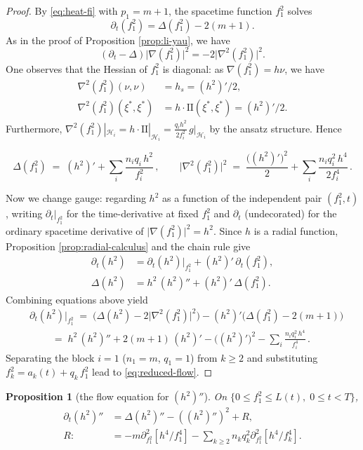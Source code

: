 \documentclass[11pt]{amsart}
\theoremstyle{plain}
\numberwithin{equation}{section}
\newtheorem{proposition}[theorem]{Proposition}
\theoremstyle{definition}
\theoremstyle{remark}
\begin{document}
\begin{proof}
	By \eqref{eq:heat-fi} with $p_1 = m + 1$, the spacetime function $f_1^2$ solves 
	\[\partial_t ( f_1^2 ) = \Delta ( f_1^2 ) - 2 ( m + 1 ).\] 
	As in the proof of Proposition \ref{prop:li-yau}, we have \[( \partial_t - \Delta ) \big| \nabla ( f_1^2 ) \big|^2 = - 2 \big| \nabla^2 ( f_1^2 ) \big|^2.\]
One observes that the Hessian of $f_1^2$ is diagonal: as $\nabla ( f_1^2 ) = h \nu$, we have
	 \begin{align*}
	 	\nabla^2 ( f_1^2 ) ( \nu, \nu ) &= h_s = ( h^2 )' / 2,\\
	 	\nabla^2 ( f_1^2 ) ( \xi^*, \xi^* ) &= h \cdot \mathrm{II} ( \xi^*, \xi^* ) = ( h^2 )' / 2.
	 \end{align*} 
Furthermore, $\nabla^2 ( f_1^2 ) |_{\mathcal{H}_i} = h \cdot \mathrm{II} |_{\mathcal{H}_i} = \tfrac{q_i h^2}{2 f_i^2}\, g |_{\mathcal{H}_i}$ by the ansatz structure. Hence
	
	\[
	\Delta ( f_1^2 ) \;=\; ( h^2 )' + \sum_i \frac{n_i q_i\, h^2}{f_i^2} \,, \qquad \big| \nabla^2 ( f_1^2 ) \big|^2 \;=\; \frac{\big( ( h^2 )' \big)^2}{2} + \sum_i \frac{n_i q_i^2\, h^4}{2 f_i^4} \,.
	\]
	
	Now we change gauge: regarding $h^2$ as a function of the independent pair $( f_1^2, t )$, writing $\partial_t \big|_{f_1^2}$ for the time-derivative at fixed $f_1^2$ and $\partial_t$ (undecorated) for the ordinary spacetime derivative of $\big| \nabla ( f_1^2 ) \big|^2 = h^2$. Since $h$ is a radial function, Proposition \ref{prop:radial-calculus} and the chain rule give	
	\begin{align*}
		\partial_t ( h^2 ) &= \partial_t ( h^2 ) \big|_{f_1^2} + ( h^2 )'\, \partial_t ( f_1^2 ),\\
		\Delta ( h^2 ) &= h^2\, ( h^2 )'' + ( h^2 )'\, \Delta ( f_1^2 ).
	\end{align*}
	Combining equations above yield 
	\begin{equation*}
		\begin{aligned}
			&\partial_t ( h^2 ) \big|_{f_1^2} \;=\; \Big( \Delta ( h^2 ) - 2 \big| \nabla^2 ( f_1^2 ) \big|^2 \Big) - ( h^2 )' \big( \Delta ( f_1^2 ) - 2 ( m + 1 ) \big) \\
			&\qquad \;=\; h^2\, ( h^2 )'' + 2 ( m + 1 )\, ( h^2 )' - \big( ( h^2 )' \big)^2 - \sum_i \frac{n_i q_i^2\, h^4}{f_i^4} \,.
		\end{aligned}
	\end{equation*}
	Separating the block $i = 1$ ($n_1 = m$, $q_1 = 1$) from $k \geq 2$ and substituting $f_k^2 = a_k (t) + q_k\, f_1^2$ lead to \eqref{eq:reduced-flow}.
	
	
\end{proof}
\begin{proposition}[the flow equation for $(h^2)''$]\label{prop:h2pp-evolution}
	On $\{ 0 \leq f_1^2 \leq L (t) ,\; 0 \leq t < T \}$,
	\begin{align}\label{eq:h2pp-evolution}
		\partial_t (h^2)'' &=\Delta (h^2)'' - ((h^2)'')^2 + R,\\
		R :&= -m \partial^2_{f_1^2} [ h^4/f_1^4 ] - \sum_{k \ge 2} n_k q_k^2 \partial^2_{f_1^2} [ h^4/f_k^4 ].\nonumber
	\end{align}
\end{proposition}
\end{document}
